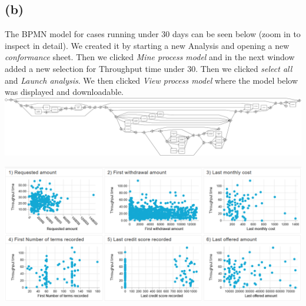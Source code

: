 \documentclass[../../main.tex]{subfiles}
\begin{document}
\subsection*{(b)}
The BPMN model for cases running under 30 days can be seen below (zoom in to inspect in detail). We created it by starting a new Analysis and opening a new \textit{conformance} sheet. Then we clicked \textit{Mine process model} and in the next window added a new selection for Throughput time under 30. Then we clicked \textit{select all} and \textit{Launch analysis}. We then clicked \textit{View process model} where the model below was displayed and downloadable.\\
\includegraphics[width=\textwidth]{img/QUESTION_5b_BPMN_model.pdf}

\includegraphics[width=\textwidth]{img/QUESTION_5b_scatter_plots.png}
\end{document}
